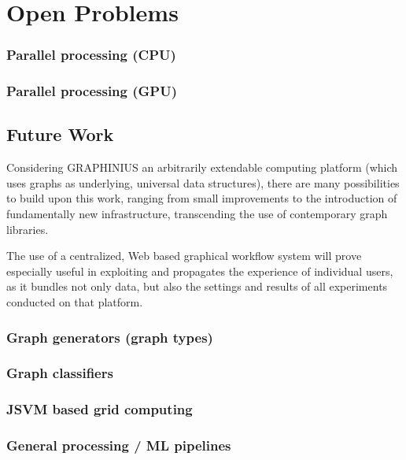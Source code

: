\chapter{Open Problems}
\label{ch:future_work}

	\subsection{Parallel processing (CPU)}
	\label{ssect:parallel_cpu}
	
	
	\subsection{Parallel processing (GPU)}
	\label{ssect:parallel_gpu}


\section{Future Work}
\label{sect:future_challenges}

Considering GRAPHINIUS an arbitrarily extendable computing platform (which uses graphs as underlying, universal data structures), there are many possibilities to build upon this work, ranging from small improvements to the introduction of fundamentally new infrastructure, transcending the use of contemporary graph libraries. 

The use of a centralized, Web based graphical workflow system will prove especially useful in exploiting and propagates the experience of individual users, as it bundles not only data, but also the settings and results of all experiments conducted on that platform.


\subsection{Graph generators (graph types)}
\label{ssect:graph_gen}


\subsection{Graph classifiers}
\label{ssect:graph_class}


\subsection{JSVM based grid computing}
\label{ssect:jsvm_grid}


\subsection{General processing / ML pipelines}
\label{ssect:pipelines}

